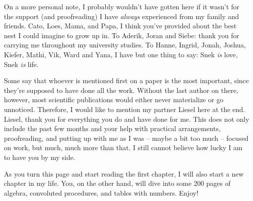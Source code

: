 On a more personal note, I probably wouldn't have gotten here if it wasn't
for the support (and proofreading) I have \emph{always} experienced
from my family and friends.
Cato, Loes, Mama, and Papa, I think you've provided about the
best nest I could imagine to grow up in. To Aderik, Joran and Siebe: thank you for
carrying me throughout my university studies.
To Hanne, Ingrid, Jonah, Joshua, Kiefer, Mathi, Vik, Ward and Yana, I have but one
thing to say: Snek \emph{is} love, Snek \emph{is} life.

Some say that whoever is mentioned first on a paper is the most
important, since they're supposed to have done all the work.
Without the last author on there, however, most scientific publications would
either never materialize or go unnoticed.
Therefore, I would like to mention my partner Liesel here at the end.
Liesel, thank you for everything you do and have done
for me. This does not only include the past few months and your help with
practical arrangements, proofreading, and putting up with me as I was
-- maybe a bit too much -- focused on work, but much, much more
than that.
I still cannot believe how lucky I am to have you by my side.

As you turn this page and start reading the first chapter, I will also
start a new chapter in my life. You, on the other hand, will dive into
some 200 pages of algebra, convoluted procedures, and tables with
numbers. Enjoy!
